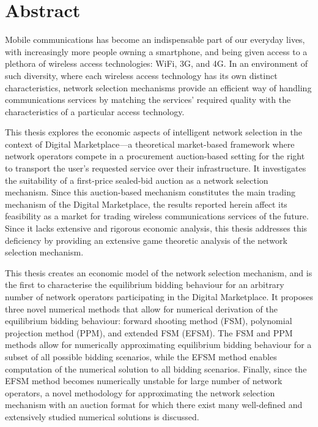 \chapter*{Abstract} %
\label{cha:abstract}

Mobile communications has become an indispensable part of our everyday lives, with increasingly more people owning a smartphone, and being given access to a plethora of wireless access technologies: WiFi, 3G, and 4G. In an environment of such diversity, where each wireless access technology has its own distinct characteristics, network selection mechanisms provide an efficient way of handling communications services by matching the services' required quality with the characteristics of a particular access technology.

This thesis explores the economic aspects of intelligent network selection in the context of Digital Marketplace---a theoretical market-based framework where network operators compete in a procurement auction-based setting for the right to transport the user's requested service over their infrastructure. It investigates the suitability of a first-price sealed-bid auction as a network selection mechanism. Since this auction-based mechanism constitutes the main trading mechanism of the Digital Marketplace, the results reported herein affect its feasibility as a market for trading wireless communications services of the future. Since it lacks extensive and rigorous economic analysis, this thesis addresses this deficiency by providing an extensive game theoretic analysis of the network selection mechanism.

This thesis creates an economic model of the network selection mechanism, and is the first to characterise the equilibrium bidding behaviour for an arbitrary number of network operators participating in the Digital Marketplace. It proposes three novel numerical methods that allow for numerical derivation of the equilibrium bidding behaviour: forward shooting method (FSM), polynomial projection method (PPM), and extended FSM (EFSM). The FSM and PPM methods allow for numerically approximating equilibrium bidding behaviour for a subset of all possible bidding scenarios, while the EFSM method enables computation of the numerical solution to all bidding scenarios. Finally, since the EFSM method becomes numerically unstable for large number of network operators, a novel methodology for approximating the network selection mechanism with an auction format for which there exist many well-defined and extensively studied numerical solutions is discussed. 
